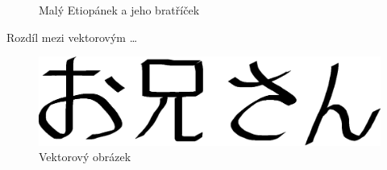 \documentclass[11pt, a4paper]{article}
\begin{document}
\begin{figure}[h]
{}
\caption{Malý Etiopánek a jeho bratříček}
\label{obr1}
\end{figure}

\newpage

Rozdíl mezi vektorovým \dots

\begin{figure}[h]
\centering
\includegraphics[scale=0.4]{oniisan.eps}
\caption{Vektorový obrázek}
\label{obr2}
\end{figure}
\end{document}
